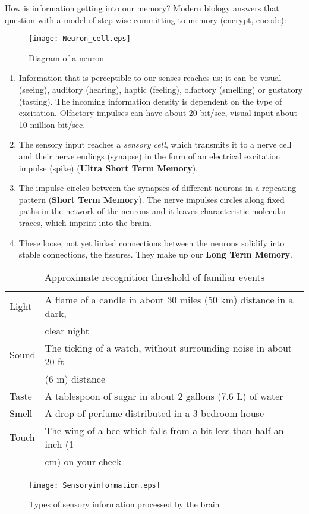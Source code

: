 \documentclass[../main.tex]{subfiles}
\begin{document}
How is information getting into our memory? Modern biology answers that question with a model of step wise committing to memory (encrypt, encode):

\begin{figure}[htb]
  \centering
  \texttt{[image: Neuron\_cell.eps]}
  \caption{Diagram of a neuron~\cite{wclipart}}
\end{figure}

\begin{enumerate}
\item Information that is {perceptible to our senses} reaches us; it can be visual (seeing), auditory (hearing), haptic (feeling), olfactory (smelling) or gustatory (tasting).
  The incoming {information density} is dependent on the type of excitation. Olfactory impulses can have about 20 bit/sec, visual input about 10 million bit/sec.
\item The sensory input reaches a \emph{sensory cell}, which transmits it to a {nerve cell} and their nerve endings (synapse) in the form of an electrical excitation impulse (spike) (\textbf{Ultra Short Term Memory}).
\item The impulse {circles} between the synapses of different neurons in a {repeating pattern} (\textbf{Short Term Memory}). The nerve impulses circles along fixed paths in the network of the neurons and it leaves {characteristic molecular traces}, which imprint into the brain.
\item These loose, not yet linked connections between the neurons solidify into {stable connections}, the {fissures}. They make up our  \textbf{Long Term Memory}.
\end{enumerate}

\begin{table}[htb]
  \centering
  \begin{tabular}{ll}
    Light & A flame of a candle in about 30 miles (50 km) distance in a dark, \\
    & clear night \\
    Sound & The ticking of a watch, without surrounding noise in about 20 ft \\
    & (6 m) distance \\
    Taste & A tablespoon of sugar in about 2 gallons (7.6 L) of water \\
    Smell & A drop of perfume distributed in a 3 bedroom house \\
    Touch & The wing of a bee which falls from a bit less than half an inch (1 \\
    & cm) on your cheek
  \end{tabular}
  \caption{Approximate recognition threshold of familiar events}
\end{table}

\begin{figure}[htb]
  \centering
  \texttt{[image: Sensoryinformation.eps]}
  \caption{Types of sensory information processed by the brain}
\end{figure}
\newpage
\end{document}
